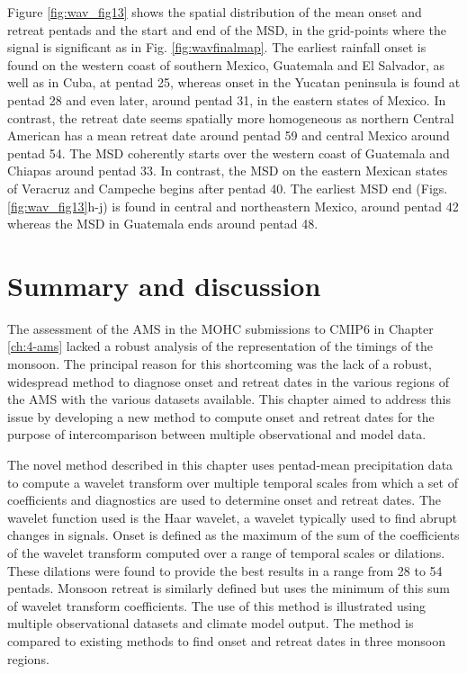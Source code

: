 Figure \ref{fig:wav_fig13} shows the spatial distribution of the mean onset and retreat pentads and the start and end of the MSD, in the grid-points where the signal is significant as in Fig. \ref{fig:wavfinalmap}. The earliest rainfall onset is found on the western coast of southern Mexico, Guatemala and El Salvador, as well as in Cuba, at pentad 25, whereas onset in the Yucatan peninsula is found at pentad 28 and even later, around pentad 31, in the eastern states of Mexico. In contrast, the retreat date seems spatially more homogeneous as northern Central American has a mean retreat date around pentad 59 and central Mexico around pentad 54.
The MSD coherently starts over the western coast of Guatemala and Chiapas around pentad 33. In contrast, the MSD on the eastern Mexican states of Veracruz and Campeche begins after pentad 40. The earliest MSD end (Figs. \ref{fig:wav_fig13}h-j) is found in central and northeastern Mexico, around pentad 42 whereas the MSD in Guatemala ends around pentad 48.



\section{Summary and discussion}

The assessment of the AMS in the MOHC submissions to CMIP6 in Chapter \ref{ch:4-ams} lacked a robust analysis of the representation of the timings of the monsoon. 
The principal reason for this shortcoming was the lack of a robust, widespread method to diagnose onset and retreat dates in the various regions of the AMS with the various datasets available. This chapter aimed to address this issue by developing a new method to compute onset and retreat dates for the purpose of intercomparison between multiple observational and model data.

The novel method described in this chapter uses pentad-mean precipitation data to compute a wavelet transform over multiple temporal scales from which a set of coefficients and diagnostics are used to determine onset and retreat dates. The wavelet function used is the Haar wavelet, a wavelet typically used to find abrupt changes in signals.
Onset is defined as the maximum of the sum of the coefficients of the wavelet transform computed over a range of temporal scales or dilations. These dilations were found to provide the best results in a range from 28 to 54 pentads. Monsoon retreat is similarly defined but uses the minimum of this sum of wavelet transform coefficients. The use of this method is illustrated using multiple observational datasets and climate model output. The method is compared to existing methods to find onset and retreat dates in three monsoon regions.

